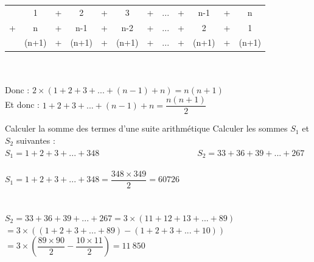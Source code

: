 \begin{bdemo}
    \begin{tabular}{ c c c c c c c c c c c c }			
         & 1 & + & 2 & + & 3 & + &... & + &n-1 & + & n \\
       + & n & + & n-1 & + & n-2 & + & ...& + & 2 & + & 1 \\
       \hline
         & (n+1) & + & (n+1) & + & (n+1) & + & ... & + & (n+1) & + & (n+1)\\
    \end{tabular} \\
    \\
    Donc : $2\times (1+2+3+...+(n-1)+n)=n(n+1)$\\
    Et donc : $1+2+3+...+(n-1)+n=\dfrac{n(n+1)}{2}$
\end{bdemo}

\begin{bmethodet}{Calculer la somme des termes d'une suite arithmétique}
    Calculer les sommes $S_1$ et $S_2$ suivantes :\\ 
    $S_1=1+2+3+...+348$\ \ \ \ \ \ \ \ \ \ \ \ \ \ \ \ \ \ \ \ \ \ \ $S_2=33+36+39+...+267$
    \\
    \\
    $S_1=1+2+3+...+348=\dfrac{348\times 349}{2}=60726$\\
    \\
    \\
    $S_2=33+36+39+...+267=3\times(11+12+13+...+89)$\\
    $=3\times((1+2+3+...+89)-(1+2+3+...+10))$\\
    $=3\times \left(\dfrac{89\times 90}{2}-\dfrac{10\times11}{2}\right)=11\ 850$
\end{bmethodet}

